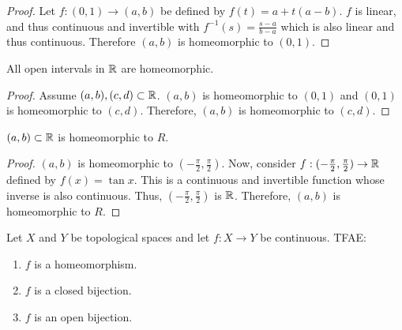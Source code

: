 \documentclass[letterpaper,12pt,fleqn]{article}
\begin{document}
\begin{proof}
  Let \(f:(0,1)\to(a,b)\) be defined by \(f(t)=a+t(a-b)\).  \(f\) is linear, and thus continuous and invertible
  with \(f^{-1}(s)=\frac{s-a}{b-a}\) which is also linear and thus continuous.  Therefore \((a,b)\) is homeomorphic
  to \((0,1)\).
\end{proof}

\begin{corollary}
  All open intervals in \(\mathbb{R}\) are homeomorphic.
\end{corollary}

\begin{proof}
  Assume \((a,b),(c,d)\subset\mathbb{R}\).  \((a,b)\) is homeomorphic to \((0,1)\) and \((0,1)\) is homeomorphic to
  \((c,d)\).  Therefore, \((a,b)\) is homeomorphic to \((c,d)\).
\end{proof}

\begin{theorem}
  \((a,b)\subset\mathbb{R}\) is homeomorphic to \(R\).
\end{theorem}

\begin{proof}
  \((a,b)\) is homeomorphic to \((-\frac{\pi}{2},\frac{\pi}{2})\).  Now, consider
  \(f:(-\frac{\pi}{2},\frac{\pi}{2})\to\mathbb{R}\) defined by \(f(x)=\tan x\).  This is a continuous and invertible
  function whose inverse is also continuous.  Thus, \((-\frac{\pi}{2},\frac{\pi}{2})\) is \(\mathbb{R}\).  Therefore,
  \((a,b)\) is homeomorphic to \(R\).
\end{proof}

\begin{theorem}
  Let \(X\) and \(Y\) be topological spaces and let \(f:X\to Y\) be continuous.  TFAE:
  \begin{enumerate}
  \item \(f\) is a homeomorphism.
  \item \(f\) is a closed bijection.
  \item \(f\) is an open bijection.
  \end{enumerate}
\end{theorem}
\end{document}
